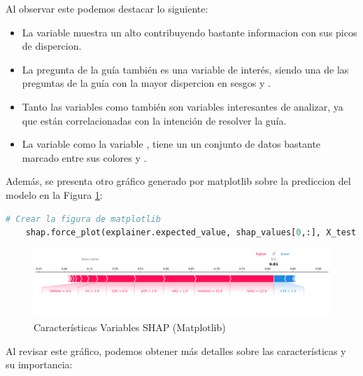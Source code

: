 Al observar este podemos destacar lo siguiente:

\begin{itemize}
    \item La variable   muestra un alto  contribuyendo bastante informacion con sus picos de dispercion.
    \item La pregunta de la guía  también es una variable de interés, siendo una de las preguntas de la guía con la mayor dispercion en sesgos  y .
    \item Tanto las variables  como  también son variables interesantes de analizar, ya que están correlacionadas con la intención de resolver la guía.
    \item La variable  como la variable , tiene un un conjunto de datos bastante marcado entre  sus colores  y .
\end{itemize}

Además, se presenta otro gráfico generado por matplotlib sobre la prediccion del modelo en la Figura \ref{fig:caract_var_shap_mat}:

\begin{lstlisting}[language=Python, caption=grafico matplotib, label=lst:graf_matplotib]
    # Crear la figura de matplotlib
    shap.force_plot(explainer.expected_value, shap_values[0,:], X_test.iloc[0,:], matplotlib=True)
\end{lstlisting}

\begin{figure}[H]
    \centering
    \includegraphics[width=1\textwidth]{img/shap_rf/shapForcePlot.png}
    \caption{Características Variables SHAP (Matplotlib)}
    \label{fig:caract_var_shap_mat}
\end{figure}

Al revisar este gráfico, podemos obtener más detalles sobre las características y su importancia:

